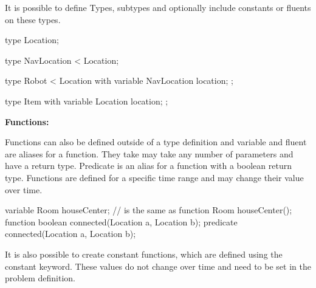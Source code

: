 It is possible to define Types, subtypes and optionally include constants or fluents on these types.








\begin{anmlcode}
type Location;

type NavLocation < Location;

type Robot < Location with {
  variable NavLocation location;
};

type Item with {
  variable Location location;
};
\end{anmlcode}


{\bf Functions:}

Functions can also be defined outside of a type definition and variable and fluent are aliases for a function.
They take may take any number of parameters and have a return type.
Predicate is an alias for a function with a boolean return type.
Functions are defined for a specific time range and may change their value over time.

\begin{anmlcode}
variable Room houseCenter; // is the same as
function Room houseCenter();
function boolean connected(Location a, Location b);
predicate connected(Location a, Location b);
\end{anmlcode}

It is also possible to create constant functions, which are defined using the constant keyword.
These values do not change over time and need to be set in the problem definition.

